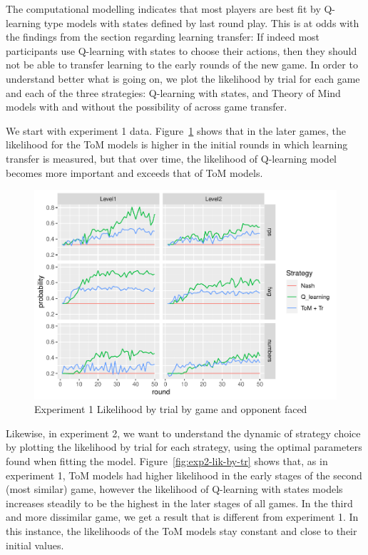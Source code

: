 \documentclass[man,floatsintext]{apa6}
\begin{document}
The computational modelling indicates that most players are best fit by Q-learning type models with states defined by last round play. This is at odds with the findings from the section regarding learning transfer: If indeed most participants use Q-learning with states to choose their actions, then they should not be able to transfer learning to the early rounds of the new game. In order to understand better what is going on, we plot the likelihood by trial for each game and each of the three strategies: Q-learning with states, and Theory of Mind models with and without the possibility of across game transfer.

We start with experiment 1 data. Figure~\ref{fig:exp1-lik-by-tr} shows that in the later games, the likelihood for the ToM models is higher in the initial rounds in which learning transfer is measured, but that over time, the likelihood of Q-learning model becomes more important and exceeds that of ToM models.

\begin{figure}

{\centering \includegraphics{draft_upgrade_v1_files/figure-latex/exp1-lik-by-tr-1} 

}

\caption{Experiment 1 Likelihood by trial by game and opponent faced}\label{fig:exp1-lik-by-tr}
\end{figure}

Likewise, in experiment 2, we want to understand the dynamic of strategy choice by plotting the likelihood by trial for each strategy, using the optimal parameters found when fitting the model. Figure~\ref{fig:exp2-lik-by-tr} shows that, as in experiment 1, ToM models had higher likelihood in the early stages of the second (most similar) game, however the likelihood of Q-learning with states models increases steadily to be the highest in the later stages of all games. In the third and more dissimilar game, we get a result that is different from experiment 1. In this instance, the likelihoods of the ToM models stay constant and close to their initial values.
\end{document}
